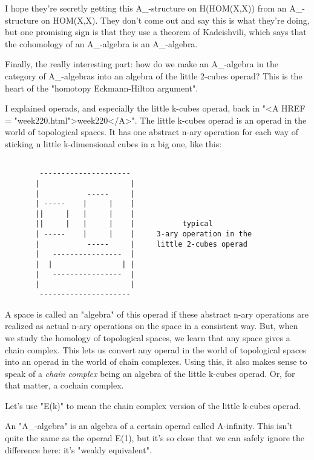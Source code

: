 I hope they're secretly getting this A_{\infty }-structure on 
H(HOM(X,X)) from an A_{\infty }-structure on HOM(X,X).  They don't
come out and say this is what they're doing, but one promising 
sign is that they use a theorem of Kadeishvili, which says that 
the cohomology of an A_{\infty }-algebra is an A_{\infty }-algebra.  

Finally, the really interesting part: how do we make an
A_{\infty }-algebra in the category of
A_{\infty }-algebras into an algebra of the little 2-cubes
operad?  This is the heart of the "homotopy Eckmann-Hilton argument".

I explained operads, and especially the little k-cubes operad, back in
"<A HREF = "week220.html">week220</A>".  The little k-cubes
operad is an operad in the world of topological spaces.  It has one
abstract n-ary operation for each way of sticking n little
k-dimensional cubes in a big one, like this:


\begin{verbatim}

        ---------------------
       |                     |
       |           -----     |
       | -----    |     |    | 
       ||     |   |     |    |
       ||     |   |     |    |           typical  
       | -----    |     |    |     3-ary operation in the       
       |           -----     |     little 2-cubes operad
       |   ----------------  |
       |  |                | |
       |   ----------------  |
       |                     |
        ---------------------
\end{verbatim}
    

A space is called an "algebra" of this operad if these abstract 
n-ary operations are realized as actual n-ary operations on the 
space in a consistent way.  But, when we study the homology 
of topological spaces, we learn that any space gives a chain complex.
This lets us convert any operad in the world of topological spaces 
into an operad in the world of chain complexes.  Using this, it also 
makes sense to speak of a \emph{chain complex} being an algebra of the
little k-cubes operad.  Or, for that matter, a cochain complex.

Let's use "E(k)" to mean the chain complex version of the little 
k-cubes operad.  

An "A_{\infty }-algebra" is an algebra of a certain
operad called A-infinity.  This isn't quite the same as the operad
E(1), but it's so close that we can safely ignore the difference here:
it's "weakly equivalent".

